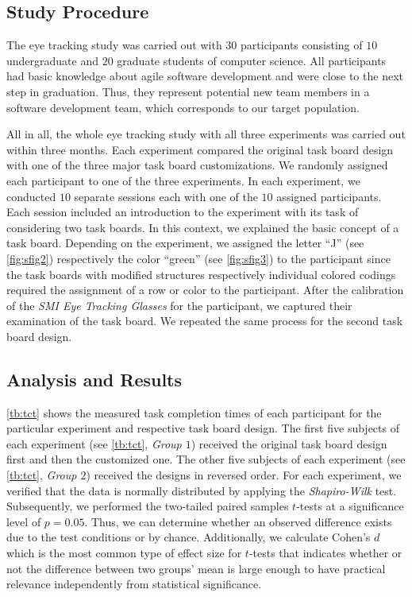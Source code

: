 \documentclass{llncs}
\begin{document}
\subsection{Study Procedure}
The eye tracking study was carried out with $30$ participants consisting of 
$10$ undergraduate and $20$ graduate students of computer science. All 
participants had basic knowledge about agile software development and were 
close to the next step in graduation. Thus, they represent potential new team 
members in a software development team, which corresponds to our target 
population.

All in all, the whole eye tracking study with all three experiments was carried 
out within three months. Each experiment compared the original task board 
design with one of the three major task board customizations. We randomly 
assigned each participant to one of the three experiments. In each experiment, 
we conducted $10$ separate sessions each with one of the $10$ assigned 
participants. Each session included an introduction to the experiment with its 
task of considering two task boards. In this context, we explained the basic 
concept of a task board. Depending on the experiment, we assigned the letter 
``J'' (see \figurename{ \ref{fig:sfig2}}) respectively the color ``green'' (see 
\figurename{ \ref{fig:sfig3}}) to the participant since the task boards with 
modified structures respectively individual colored codings required the 
assignment of a row or color to the participant. After the calibration of the 
\textit{SMI Eye Tracking Glasses} for the participant, we captured their 
examination of the task board. We repeated the same process for the second task 
board design.

\subsection{Analysis and Results}
\tablename{ \ref{tb:tct}} shows the measured task completion times of each 
participant for the particular experiment and respective task board design. The 
first five subjects of each experiment (see \tablename{ \ref{tb:tct}}, 
\textit{Group $1$}) received the original task board design first and then the 
customized one. The other five subjects of each experiment (see \tablename{ 
\ref{tb:tct}}, \textit{Group $2$}) received the designs in reversed order. For 
each experiment, we verified that the data is normally distributed by applying 
the \textit{Shapiro-Wilk} test. Subsequently, we performed the two-tailed 
paired samples $t$-tests at a significance level of $p = 0.05$. Thus, we can 
determine whether an observed difference exists due to the test conditions or 
by chance. Additionally, we calculate Cohen's $d$ which is the most common 
type of effect size for $t$-tests that indicates whether or not the difference 
between two groups' mean is large enough to have practical relevance 
independently from statistical significance.
\end{document}
